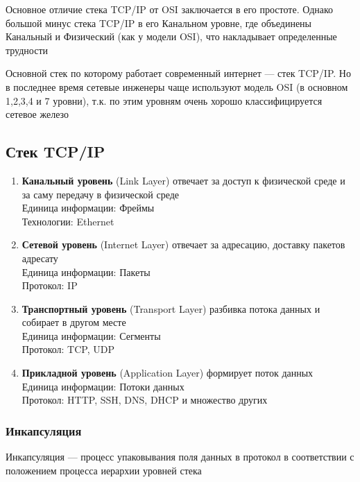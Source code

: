 \documentclass[a4paper]{article}
\begin{document}
Основное отличие стека TCP/IP от OSI заключается в его простоте. Однако большой минус стека TCP/IP в его Канальном уровне, где объединены Канальный и Физический (как у модели OSI), что накладывает определенные трудности

Основной стек по которому работает современный интернет --- стек TCP/IP. Но в последнее время сетевые инженеры чаще используют модель OSI (в основном 1,2,3,4 и 7 уровни), т.к. по этим уровням очень хорошо классифицируется сетевое железо

\subsection{Стек TCP/IP}
\begin{enumerate}
	\item \textbf{Канальный уровень} (Link Layer) отвечает за доступ к физической среде и за саму передачу в физической среде \\
	Единица информации: Фреймы \\
	Технологии: Ethernet 
	\item \textbf{Сетевой уровень} (Internet Layer) отвечает за адресацию, доставку пакетов адресату \\
	Единица информации: Пакеты \\
	Протокол: IP
	\item \textbf{Транспортный уровень} (Transport Layer) разбивка потока данных и собирает в другом месте\\
	Единица информации: Сегменты \\
	Протокол: TCP, UDP
	\item \textbf{Прикладной уровень} (Application Layer) формирует поток данных \\
	Единица информации: Потоки данных \\
	Протокол: HTTP, SSH, DNS, DHCP и множество других
\end{enumerate}

\subsubsection{Инкапсуляция}
Инкапсуляция --- процесс упаковывания поля данных в протокол в соответствии с положением процесса иерархии уровней стека 
\end{document}
